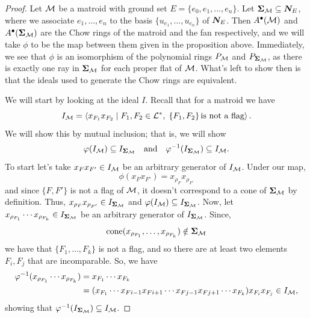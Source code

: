 \documentclass[12pt,oneside]{../../sfsuthesis}
\begin{document}
\begin{proof}
    Let \( \mathcal{M} \) be a matroid with ground set \( E = \{ e_0, e_1, \dots, e_n \} \).
    Let \( {\bm{\Sigma}}_{\mathcal{M}} \subseteq \bm{N}_E \), where we associate \( e_1, \dots, e_n \) to the basis \( \{ u_{e_1}, \dots, u_{e_n} \} \) of \( \bm{N}_E \).
    Then \( A^\bullet(\mathcal{M}) \) and \( A^\bullet({\bm{\Sigma}}_{\mathcal{M}}) \) are the Chow rings of the matroid and the fan respectively, and we will take \( \phi \) to be the map between them given in the proposition above.
    Immediately, we see that \( \phi \) is an isomorphism of the polynomial rings \( P_{\mathcal{M}} \) and \( P_{{\bm{\Sigma}}_{\mathcal{M}}} \), as there is exactly one ray in \( {\bm{\Sigma}}_{\mathcal{M}} \) for each proper flat of \( \mathcal{M} \).
    What's left to show then is that the ideals used to generate the Chow rings are equivalent.

    We will start by looking at the ideal \( I \).
    Recall that for a matroid we have
    \[
        I_{\mathcal{M}} = \left\langle x_{F_1}x_{F_2} \; \middle| \; F_1, F_2 \in \mathcal{L}^\ast, \; \{F_1, F_2\} \, \text{is not a flag} \right\rangle.
    \]
    We will show this by mutual inclusion; that is, we will show
    \[
        \varphi(I_{\mathcal{M}}) \subseteq I_{{\bm{\Sigma}}_{\mathcal{M}}} \quad \text{and} \quad \varphi^{-1}(I_{{\bm{\Sigma}}_{\mathcal{M}}}) \subseteq I_{\mathcal{M}}.
    \]
    To start let's take \( x_{F}x_{F'} \in I_{\mathcal{M}} \) be an arbitrary generator of \( I_{\mathcal{M}} \).
    Under our map,
    \[ \phi(x_{F}x_{F'}) = x_{\rho_F}x_{\rho_{F'}} \]
    and since \( \{F, F'\} \) is not a flag of \( \mathcal{M} \), it doesn't correspond to a cone of \( {\bm{\Sigma}}_{\mathcal{M}} \) by definition.
    Thus, \(  x_{\rho_F}x_{\rho_{F'}} \in I_{{\bm{\Sigma}}_{\mathcal{M}}} \) and \( \varphi(I_{\mathcal{M}}) \subseteq I_{{\bm{\Sigma}}_{\mathcal{M}}} \).
    Now, let \( x_{\rho_{F_1}} \cdots x_{\rho_{F_k}} \in I_{{\bm{\Sigma}}_{\mathcal{M}}} \) be an arbitrary generator of \( I_{{\bm{\Sigma}}_{\mathcal{M}}} \).
    Since,
    \[
        \mathrm{cone}(x_{\rho_{F_1}}, \dots, x_{\rho_{F_k}}) \notin {\bm{\Sigma}}_{\mathcal{M}}
    \]
    we have that \( \{ F_1, \dots, F_k \} \) is not a flag, and so there are at least two elements \( F_i, F_j \) that are incomparable.
    So, we have
    \begin{align*}
        \varphi^{-1}(x_{\rho_{F_1}} \cdots x_{\rho_{F_k}}) & = x_{F_1} \cdots x_{F_k}                                                                                       \\
                                                        & = (x_{F_1} \cdots x_{F{i-1}} x_{F{i+1}} \cdots x_{F{j-1}} x_{F{j+1}} \cdots x_{F_k}) x_{F_i}x_{F_j} \in I_{\mathcal{M}},
    \end{align*}
    showing that \( \varphi^{-1}(I_{{\bm{\Sigma}}_{\mathcal{M}}}) \subseteq  I_{\mathcal{M}} \).


\end{proof}
\end{document}
